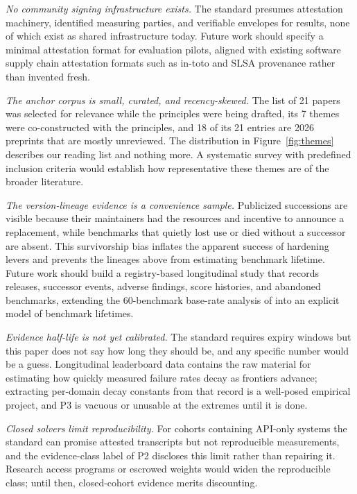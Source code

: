 \documentclass[11pt]{article}
\begin{document}
\emph{No community signing infrastructure exists.} The standard presumes attestation machinery, identified measuring parties, and verifiable envelopes for results, none of which exist as shared infrastructure today. Future work should specify a minimal attestation format for evaluation pilots, aligned with existing software supply chain attestation formats such as in-toto and SLSA provenance rather than invented fresh.

\emph{The anchor corpus is small, curated, and recency-skewed.} The list of 21 papers was selected for relevance while the principles were being drafted, its 7 themes were co-constructed with the principles, and 18 of its 21 entries are 2026 preprints that are mostly unreviewed. The distribution in Figure~\ref{fig:themes} describes our reading list and nothing more. A systematic survey with predefined inclusion criteria would establish how representative these themes are of the broader literature.

\emph{The version-lineage evidence is a convenience sample.} Publicized successions are visible because their maintainers had the resources and incentive to announce a replacement, while benchmarks that quietly lost use or died without a successor are absent. This survivorship bias inflates the apparent success of hardening levers and prevents the lineages above from estimating benchmark lifetime. Future work should build a registry-based longitudinal study that records releases, successor events, adverse findings, score histories, and abandoned benchmarks, extending the 60-benchmark base-rate analysis of \citet{akhtar2026when} into an explicit model of benchmark lifetimes.

\emph{Evidence half-life is not yet calibrated.} The standard requires expiry windows but this paper does not say how long they should be, and any specific number would be a guess. Longitudinal leaderboard data contains the raw material for estimating how quickly measured failure rates decay as frontiers advance; extracting per-domain decay constants from that record is a well-posed empirical project, and P3 is vacuous or unusable at the extremes until it is done.

\emph{Closed solvers limit reproducibility.} For cohorts containing API-only systems the standard can promise attested transcripts but not reproducible measurements, and the evidence-class label of P2 discloses this limit rather than repairing it. Research access programs or escrowed weights would widen the reproducible class; until then, closed-cohort evidence merits discounting.
\end{document}
